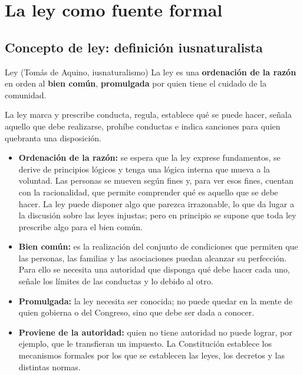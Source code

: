 \documentclass[12pt,oneside]{book}
\begin{document}
\chapter[La ley como fuente formal]{La ley como fuente formal}

\section{Concepto de ley: definición iusnaturalista}

\begin{definition}{Ley (Tomás de Aquino, iusnaturalismo)}
La ley es una \textbf{ordenación de la razón} en orden al \textbf{bien común}, \textbf{promulgada} por quien tiene el cuidado de la comunidad.
\end{definition}

La ley marca y prescribe conducta, regula, establece qué se puede hacer, señala aquello que debe realizarse, prohíbe conductas e indica sanciones para quien quebranta una disposición.

\begin{itemize}
    \item \textbf{Ordenación de la razón:} se espera que la ley exprese fundamentos, se derive de principios lógicos y tenga una lógica interna que mueva a la voluntad. Las personas se mueven según fines y, para ver esos fines, cuentan con la racionalidad, que permite comprender qué es aquello que se debe hacer. La ley puede disponer algo que parezca irrazonable, lo que da lugar a la discusión sobre las leyes injustas; pero en principio se supone que toda ley prescribe algo para el bien común.
    \item \textbf{Bien común:} es la realización del conjunto de condiciones que permiten que las personas, las familias y las asociaciones puedan alcanzar su perfección. Para ello se necesita una autoridad que disponga qué debe hacer cada uno, señale los límites de las conductas y lo debido al otro.
    \item \textbf{Promulgada:} la ley necesita ser conocida; no puede quedar en la mente de quien gobierna o del Congreso, sino que debe ser dada a conocer.
    \item \textbf{Proviene de la autoridad:} quien no tiene autoridad no puede lograr, por ejemplo, que le transfieran un impuesto. La Constitución establece los mecanismos formales por los que se establecen las leyes, los decretos y las distintas normas.
\end{itemize}
\end{document}

